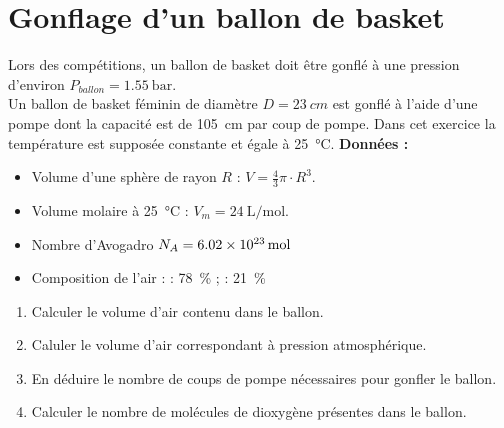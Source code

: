 \documentclass[a4paper,12pt,fleqn]{article}%
\begin{document}
\maketitle

\section{Gonflage d'un ballon de basket}

Lors des compétitions, un ballon de basket doit être gonflé à une pression d'environ $P_{ballon}=\SI{1,55}{\bar}$.\\
Un ballon de basket féminin de diamètre $D=\SI{23}{cm}$ est gonflé à l'aide d'une pompe dont la capacité est de \SI{105}{\centi\meter} par coup de pompe. Dans cet exercice la température est supposée constante et égale à \SI{25}{\celsius}.
\textbf{Données :}
\begin{itemize}
    \item Volume d'une sphère de rayon $R$ :  $V = \frac{4}{3}\pi \cdot R^3$.
    \item Volume molaire à \SI{25}{\celsius} : $V_m = \SI{24}{\liter\per\mole}$.
    \item Nombre d'Avogadro $N_A = \SI{6,02E23}{\mole}$
    \item Composition de l'air :  : \SI{78}{\percent} ;  : \SI{21}{\percent}
\end{itemize}
\begin{enumerate}
    \item Calculer le volume d'air contenu dans le ballon.
    \item Caluler le volume d'air correspondant à pression atmosphérique.
    \item En déduire le nombre de coups de pompe nécessaires pour gonfler le ballon.
    \item Calculer le nombre de molécules de dioxygène présentes dans le ballon.
\end{enumerate}
\end{document}

